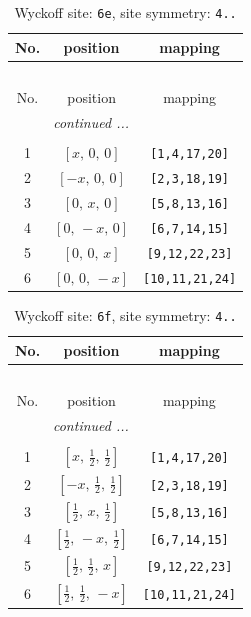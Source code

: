 \documentclass[fleqn,8pt]{jsarticle}
\begin{document}
\begin{longtable}{ccc}
\caption{Wyckoff site: {\tt 6e}, site symmetry: {\tt 4..}}
 \\
 \hline \hline
No. & position & mapping \\ \hline \endfirsthead

\multicolumn{2}{l}{\tablename\ \thetable{}} \\
 \hline \hline
No. & position & mapping \\ \hline \endhead

 \hline \hline
\multicolumn{2}{r}{\footnotesize\it continued ...} \\ \endfoot

 \hline \hline
\multicolumn{2}{r}{} \\ \endlastfoot

1 & $\left[ x,\, 0,\, 0 \right]$ & {\tt [1,4,17,20]} \\ \hline
2 & $\left[ - x,\, 0,\, 0 \right]$ & {\tt [2,3,18,19]} \\ \hline
3 & $\left[ 0,\, x,\, 0 \right]$ & {\tt [5,8,13,16]} \\ \hline
4 & $\left[ 0,\, - x,\, 0 \right]$ & {\tt [6,7,14,15]} \\ \hline
5 & $\left[ 0,\, 0,\, x \right]$ & {\tt [9,12,22,23]} \\ \hline
6 & $\left[ 0,\, 0,\, - x \right]$ & {\tt [10,11,21,24]} \\
\end{longtable}
\renewcommand{\arraystretch}{1.2}
\begin{longtable}{ccc}
\caption{Wyckoff site: {\tt 6f}, site symmetry: {\tt 4..}}
 \\
 \hline \hline
No. & position & mapping \\ \hline \endfirsthead

\multicolumn{2}{l}{\tablename\ \thetable{}} \\
 \hline \hline
No. & position & mapping \\ \hline \endhead

 \hline \hline
\multicolumn{2}{r}{\footnotesize\it continued ...} \\ \endfoot

 \hline \hline
\multicolumn{2}{r}{} \\ \endlastfoot

1 & $\left[ x,\, \frac{1}{2},\, \frac{1}{2} \right]$ & {\tt [1,4,17,20]} \\ \hline
2 & $\left[ - x,\, \frac{1}{2},\, \frac{1}{2} \right]$ & {\tt [2,3,18,19]} \\ \hline
3 & $\left[ \frac{1}{2},\, x,\, \frac{1}{2} \right]$ & {\tt [5,8,13,16]} \\ \hline
4 & $\left[ \frac{1}{2},\, - x,\, \frac{1}{2} \right]$ & {\tt [6,7,14,15]} \\ \hline
5 & $\left[ \frac{1}{2},\, \frac{1}{2},\, x \right]$ & {\tt [9,12,22,23]} \\ \hline
6 & $\left[ \frac{1}{2},\, \frac{1}{2},\, - x \right]$ & {\tt [10,11,21,24]} \\
\end{longtable}
\end{document}
